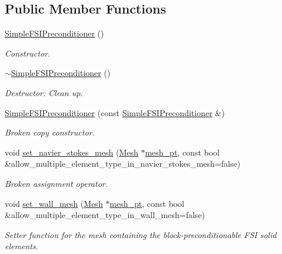 \subsection*{Public Member Functions}
\begin{DoxyCompactItemize}
\item 
\hyperlink{classoomph_1_1SimpleFSIPreconditioner_a597c5d3292b1e5e9001f8a738f186a73}{Simple\+F\+S\+I\+Preconditioner} ()
\begin{DoxyCompactList}\small\item\em Constructor. \end{DoxyCompactList}\item 
\hyperlink{classoomph_1_1SimpleFSIPreconditioner_a86515bb32fe8a2cdffda1d185751109d}{$\sim$\+Simple\+F\+S\+I\+Preconditioner} ()
\begin{DoxyCompactList}\small\item\em Destructor\+: Clean up. \end{DoxyCompactList}\item 
\hyperlink{classoomph_1_1SimpleFSIPreconditioner_a427e372b3153e9a26aa97c76d69e28a4}{Simple\+F\+S\+I\+Preconditioner} (const \hyperlink{classoomph_1_1SimpleFSIPreconditioner}{Simple\+F\+S\+I\+Preconditioner} \&)
\begin{DoxyCompactList}\small\item\em Broken copy constructor. \end{DoxyCompactList}\item 
void \hyperlink{classoomph_1_1SimpleFSIPreconditioner_ab9c5875d7186cfb5c55cecb72bed50b3}{set\+\_\+navier\+\_\+stokes\+\_\+mesh} (\hyperlink{classoomph_1_1Mesh}{Mesh} $\ast$\hyperlink{classoomph_1_1BlockPreconditioner_a3c0e92cb77c3e3179007fe9fd99b6428}{mesh\+\_\+pt}, const bool \&allow\+\_\+multiple\+\_\+element\+\_\+type\+\_\+in\+\_\+navier\+\_\+stokes\+\_\+mesh=false)
\begin{DoxyCompactList}\small\item\em Broken assignment operator. \end{DoxyCompactList}\item 
void \hyperlink{classoomph_1_1SimpleFSIPreconditioner_a324b53aaedfc8f0a2cc3da921ef94686}{set\+\_\+wall\+\_\+mesh} (\hyperlink{classoomph_1_1Mesh}{Mesh} $\ast$\hyperlink{classoomph_1_1BlockPreconditioner_a3c0e92cb77c3e3179007fe9fd99b6428}{mesh\+\_\+pt}, const bool \&allow\+\_\+multiple\+\_\+element\+\_\+type\+\_\+in\+\_\+wall\+\_\+mesh=false)
\begin{DoxyCompactList}\small\item\em Setter function for the mesh containing the block-\/preconditionable F\+SI solid elements. \end{DoxyCompactList}\item 

\end{DoxyCompactItemize}
